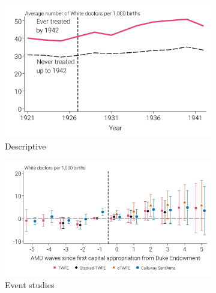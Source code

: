 \documentclass[12pt]{article}
\begin{document}
\newpage
{}
\begin{figure}
    \caption[White physician results by treatment status, quality, and event time.]{White physician results by treatment status, quality, and event time.}
    \centering
  \begin{minipage}{\linewidth}
  \begin{subfigure}[b]{0.49\columnwidth}
    \caption{\scriptsize{Descriptive}}
    \includegraphics[width=.9\linewidth]{../analysis/output/appendix/figure_c2a1_white_rMD_by_treatment_status.pdf}
  \end{subfigure} 
  \begin{subfigure}[b]{0.49\columnwidth}
    \caption{\scriptsize{Event studies}}
    \includegraphics[width=\linewidth]{../analysis/output/appendix/figure_c2b1_all_white_doctors_first_stage.pdf}
  \end{subfigure}  
  \begin{subfigure}[b]{0.49\columnwidth}

\end{subfigure}
\end{minipage}
\end{figure}
\end{document}

